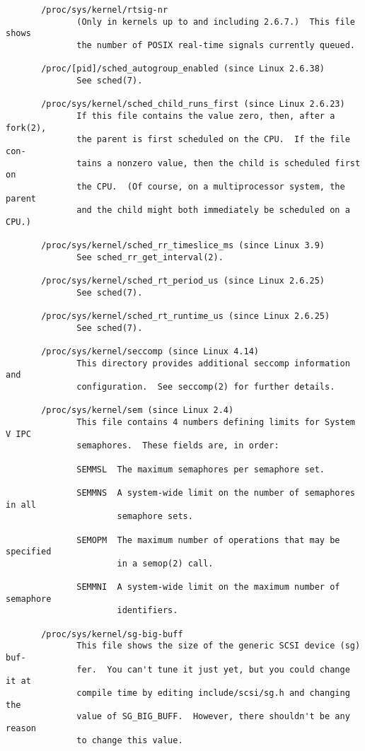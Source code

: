 \documentclass[]{article}
\begin{document}
\begin{verbatim}
       /proc/sys/kernel/rtsig-nr
              (Only in kernels up to and including 2.6.7.)  This file shows
              the number of POSIX real-time signals currently queued.

       /proc/[pid]/sched_autogroup_enabled (since Linux 2.6.38)
              See sched(7).

       /proc/sys/kernel/sched_child_runs_first (since Linux 2.6.23)
              If this file contains the value zero, then, after a fork(2),
              the parent is first scheduled on the CPU.  If the file con‐
              tains a nonzero value, then the child is scheduled first on
              the CPU.  (Of course, on a multiprocessor system, the parent
              and the child might both immediately be scheduled on a CPU.)

       /proc/sys/kernel/sched_rr_timeslice_ms (since Linux 3.9)
              See sched_rr_get_interval(2).

       /proc/sys/kernel/sched_rt_period_us (since Linux 2.6.25)
              See sched(7).

       /proc/sys/kernel/sched_rt_runtime_us (since Linux 2.6.25)
              See sched(7).

       /proc/sys/kernel/seccomp (since Linux 4.14)
              This directory provides additional seccomp information and
              configuration.  See seccomp(2) for further details.

       /proc/sys/kernel/sem (since Linux 2.4)
              This file contains 4 numbers defining limits for System V IPC
              semaphores.  These fields are, in order:

              SEMMSL  The maximum semaphores per semaphore set.

              SEMMNS  A system-wide limit on the number of semaphores in all
                      semaphore sets.

              SEMOPM  The maximum number of operations that may be specified
                      in a semop(2) call.

              SEMMNI  A system-wide limit on the maximum number of semaphore
                      identifiers.

       /proc/sys/kernel/sg-big-buff
              This file shows the size of the generic SCSI device (sg) buf‐
              fer.  You can't tune it just yet, but you could change it at
              compile time by editing include/scsi/sg.h and changing the
              value of SG_BIG_BUFF.  However, there shouldn't be any reason
              to change this value.


\end{verbatim}
\end{document}
